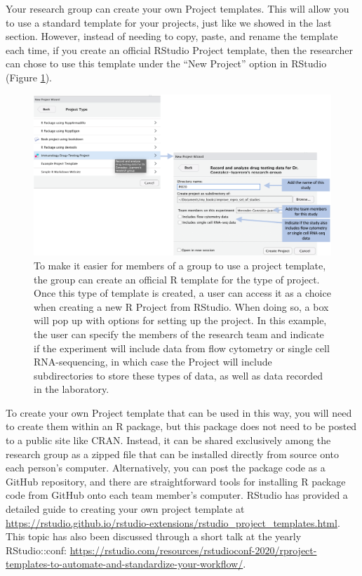 \documentclass[]{tufte-book}
\begin{document}
Your research group can create your own Project templates. This will allow
you to use a standard template for your projects, just like we showed in the
last section. However, instead of needing to copy, paste, and rename the template
each time, if you create an official RStudio Project template, then the researcher
can chose to use this template under the ``New Project'' option in RStudio
(Figure \ref{fig:exampleprojectwizard}).

\begin{figure}
\includegraphics[width=\textwidth]{figures/project_example_project_template} \caption[To make it easier for members of a group to use a project template, the group can create an official R template for the type of project]{To make it easier for members of a group to use a project template, the group can create an official R template for the type of project. Once this type of template is created, a user can access it as a choice when creating a new R Project from RStudio. When doing so, a box will pop up with options for setting up the project. In this example, the user can specify the members of the research team and indicate if the experiment will include data from flow cytometry or single cell RNA-sequencing, in which case the Project will include subdirectories to store these types of data, as well as data recorded in the laboratory.}\label{fig:exampleprojectwizard}
\end{figure}

To create your own Project template that can be used in this way, you will need to
create them within an R package, but this package does not need to be posted to
a public site like CRAN. Instead, it can be shared exclusively among the
research group as a zipped file that can be installed directly from source onto
each person's computer. Alternatively, you can post the package code as a GitHub
repository, and there are straightforward tools for installing R package code
from GitHub onto each team member's computer. RStudio has provided a
detailed guide to creating your own project template at
\url{https://rstudio.github.io/rstudio-extensions/rstudio_project_templates.html}.
This topic has also been discussed through a short talk at the
yearly RStudio::conf: \url{https://rstudio.com/resources/rstudioconf-2020/rproject-templates-to-automate-and-standardize-your-workflow/}.
\end{document}
